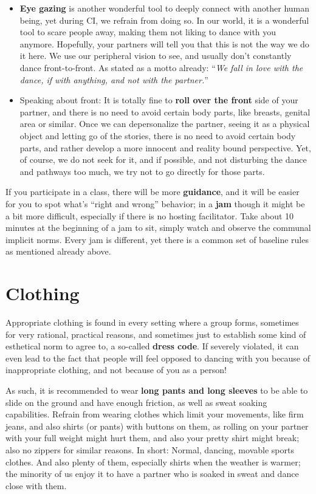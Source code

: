 \begin{itemize}
    \item \textbf{Eye gazing} is another wonderful tool to deeply connect with another human being, yet during CI, we refrain from doing so.
    In our world, it is a wonderful tool to scare people away, making them not liking to dance with you anymore.
    Hopefully, your partners will tell you that this is not the way we do it here.
    We use our peripheral vision to see, and usually don't constantly dance front-to-front.
    As stated as a motto already: ``\textit{We fall in love with the dance, if with anything, and not with the partner.}''
    \item Speaking about front: It is totally fine to \textbf{roll over the front} side of your partner, and there is no need to avoid certain body parts, like breasts, genital area or similar.
    Once we can depersonalize the partner, seeing it as a physical object and letting go of the stories, there is no need to avoid certain body parts, and rather develop a more innocent and reality bound perspective.
    Yet, of course, we do not seek for it, and if possible, and not disturbing the dance and pathways too much, we try not to go directly for those parts.
\end{itemize}

If you participate in a class, there will be more \textbf{guidance}, and it will be easier for you to spot what's ``right and wrong'' behavior; in a \textbf{jam} though it might be a bit more difficult, especially if there is no hosting facilitator.
Take about 10 minutes at the beginning of a jam to sit, simply watch and observe the communal implicit norms.
Every jam is different, yet there is a common set of baseline rules as mentioned already above.

\section{Clothing}\label{sec:clothing}

Appropriate clothing is found in every setting where a group forms, sometimes for very rational, practical reasons, and sometimes just to establish some kind of esthetical norm to agree to, a so-called \textbf{dress code}.
If severely violated, it can even lead to the fact that people will feel opposed to dancing with you because of inappropriate clothing, and not because of you as a person!

As such, it is recommended to wear \textbf{long pants and long sleeves} to be able to slide on the ground and have enough friction, as well as sweat soaking capabilities.
Refrain from wearing clothes which limit your movements, like firm jeans, and also shirts (or pants) with buttons on them, as rolling on your partner with your full weight might hurt them, and also your pretty shirt might break; also no zippers for similar reasons.
In short: Normal, dancing, movable sports clothes.
And also plenty of them, especially shirts when the weather is warmer; the minority of us enjoy it to have a partner who is soaked in sweat and dance close with them.

